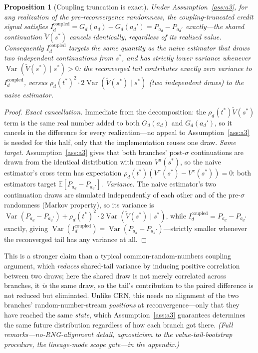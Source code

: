 \documentclass[review,authoryear,3p,times]{elsarticle}
\newtheorem{proposition}{Proposition}
\newcommand{\Ex}{\mathbb{E}}
\newcommand{\Var}{\operatorname{Var}}
\begin{document}
\begin{proposition}[Coupling truncation is exact]\label{prop:coupling}
Under Assumption~\ref{ass:a3}, for any realization of the pre-reconvergence
randomness, the coupling-truncated credit signal satisfies
$I_d^{\text{coupled}}=G_d(a_d)-G_d(a_d')=P_{a_d}-P_{a_d'}$ exactly---the
shared continuation $\tilde V(s^{*})$ cancels identically, regardless of its
realized value. Consequently $I_d^{\text{coupled}}$ targets the same quantity
as the naive estimator that draws two independent continuations from
$s^{*}$, and has strictly lower variance whenever $\Var(\tilde V(s^{*})\mid
s^{*})>0$: the reconverged tail contributes exactly zero variance to
$I_d^{\text{coupled}}$, versus $\rho_d(t^{*})^2\cdot 2\Var(\tilde V(s^{*})\mid
s^{*})$ (two independent draws) to the naive estimator.
\end{proposition}
\begin{proof}
\emph{Exact cancellation.} Immediate from the decomposition: the
$\rho_d(t^{*})\tilde V(s^{*})$ term is the same real number added to both
$G_d(a_d)$ and $G_d(a_d')$, so it cancels in the difference for every
realization---no appeal to Assumption~\ref{ass:a3} is needed for this half,
only that the implementation reuses one draw.
\emph{Same target.} Assumption~\ref{ass:a3} gives that both branches'
post-$\sigma$ continuations are drawn from the identical distribution with
mean $V^{\pi}(s^{*})$, so the naive estimator's cross term has expectation
$\rho_d(t^{*})(V^{\pi}(s^{*})-V^{\pi}(s^{*}))=0$: both estimators target
$\Ex[P_{a_d}-P_{a_d'}]$.
\emph{Variance.} The naive estimator's two continuation draws are simulated
independently of each other and of the pre-$\sigma$ randomness (Markov
property), so its variance is $\Var(P_{a_d}-P_{a_d'})+\rho_d(t^{*})^2\cdot
2\Var(\tilde V(s^{*})\mid s^{*})$, while $I_d^{\text{coupled}}=P_{a_d}-P_{a_d'}$
exactly, giving $\Var(I_d^{\text{coupled}})=\Var(P_{a_d}-P_{a_d'})$---strictly
smaller whenever the reconverged tail has any variance at all.
\end{proof}

This is a stronger claim than a typical common-random-numbers coupling
argument, which \emph{reduces} shared-tail variance by inducing positive
correlation between two draws; here the shared draw is not merely correlated
across branches, it \emph{is} the same draw, so the tail's contribution to
the paired difference is not reduced but eliminated. Unlike CRN, this needs
no alignment of the two branches' random-number-stream \emph{positions} at
reconvergence---only that they have reached the same \emph{state}, which
Assumption~\ref{ass:a3} guarantees determines the same future distribution
regardless of how each branch got there. \emph{(Full remarks---no-RNG-alignment
detail, agnosticism to the value-tail-bootstrap procedure, the lineage-mode
scope gate---in the appendix.)}
\end{document}

